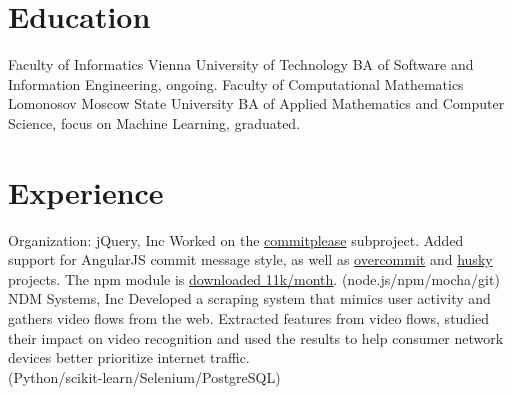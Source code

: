 \documentclass[11pt,a4paper,oneside,roman]{moderncv}
\begin{document}
\makecvtitle

\section{Education}
        {Faculty of Informatics}
        {Vienna University of Technology}
        {}{}
        {BA of Software and Information Engineering, ongoing.}
        {Faculty of Computational Mathematics}
        {Lomonosov Moscow State University}
        {}{}
        {BA of Applied Mathematics and Computer Science, focus on Machine Learning, graduated.}
\section{Experience}
        {Organization: jQuery, Inc}{}
        {}{Worked on the \href{https://github.com/jzaefferer/commitplease/}{commitplease} subproject. Added support for AngularJS commit message style, as well as \href{https://github.com/brigade/overcommit}{overcommit} and \href{https://github.com/typicode/husky}{husky} projects. The npm module is \href{https://www.npmjs.com/package/commitplease}{downloaded 11k/month}. (node.js/npm/mocha/git)}
        {NDM Systems, Inc}
        {}{}
        {Developed a scraping system that mimics user activity and gathers video flows from the web. Extracted features from video flows, studied their impact on video recognition and used the results to help consumer network devices better prioritize internet traffic. \\ (Python/scikit-learn/Selenium/PostgreSQL)}


\end{document}
